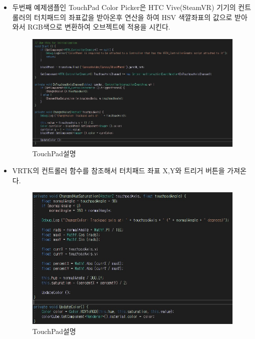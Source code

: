 \documentclass{report}
\begin{document}
    \begin{itemize}
    

    \item 두번째 예제샘플인 TouchPad Color Picker은 HTC Vive(SteamVR) 기기의 컨트롤러의 터치패드의 좌표값을 받아온후 연산을 하여 HSV 색깔좌표의 값으로 받아와서 RGB색으로 변환하여 오브젝트에 적용을 시킨다. 
    
    \begin{figure}[h!]
    \centering
    \includegraphics[width=1.0\textwidth]{2-2-1}
    \caption{TouchPad설명}
    \end{figure}
    
    \item VRTK의 컨트롤러 함수를 참조해서 터치패드 좌표 X,Y와 트리거 버튼을 가져온다. 
    
    \begin{figure}[h!]
    \centering
    \includegraphics[width=1.0\textwidth]{2-2-1-1.jpg}
    \caption{TouchPad설명}
    \end{figure}
    
   


    \end{itemize}
    
\end{document}
